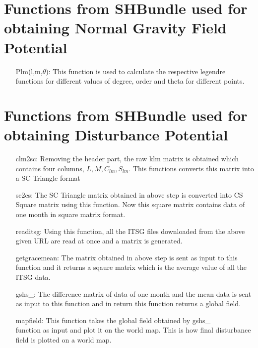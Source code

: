 \documentclass[a4paper,12pt]{report}
\begin{document}
\section{Functions from SHBundle used for obtaining Normal Gravity Field Potential}
\begin{itemize}
	\item[Plm(l,m,$\theta$): ] This function is used to calculate the respective legendre functions for different values of degree, order and theta for different points.
\end{itemize}

\section{Functions from SHBundle used for obtaining Disturbance Potential}
\begin{itemize}
	\item[clm2sc: ] Removing the header part, the raw 			klm matrix is obtained which contains four columns, $L, 	M, C_{lm}, S_{lm}$. This functions converts this matrix 	into a SC Triangle format
	
	\item[sc2cs: ]The SC Triangle matrix obtained in 			above step is converted into CS Square matrix using 			this function. Now this square matrix contains data of 			one month in square matrix format.
	
	\item[readitsg: ]Using this function, all the ITSG 	files downloaded from the above given URL are read at 			once and a matrix is generated.
	
	\item[getgracemean: ]The matrix obtained in above 			step is sent as input to this function and it returns a 	sqaure matrix which is the average value of all the 			ITSG data.
	
	\item[gshs\_: ]The difference matrix of data of 			one month and the mean data is sent as input to this 			function and in return this function returns a global 			field.
	
	\item[mapfield: ]This function takes the global 			field obtained by gshs\_\\ function as input and plot 			it on the world map. This is how final disturbance 			field is plotted on a world map.
	
\end{itemize}
\end{document}
